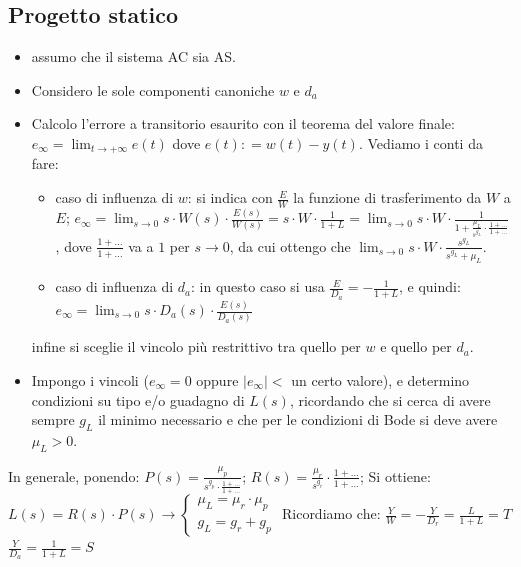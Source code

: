     \subsection{Progetto statico}
    \begin{itemize}
        \item assumo che il sistema AC sia AS.
        \item Considero le sole componenti canoniche $w$ e $d_a$
        \item Calcolo l'errore a transitorio esaurito con il teorema del valore finale:\newline
        $e_\infty = \lim_{t\rightarrow +\infty} e(t)$ dove $e(t) : = w(t) - y(t)$.\newline
        Vediamo i conti da fare:
        \begin{itemize}
            \item caso di influenza di $w$: si indica con $\frac{E}{W}$ la funzione di trasferimento da $W$ a $E$; $e_\infty = \lim_{s\rightarrow 0} s \cdot W(s) \cdot \frac{E(s)}{W(s)} = s \cdot W \cdot  \frac{1}{1+L} = \lim_{s\rightarrow 0} s \cdot W \cdot \frac{1}{1+ \frac{\mu_L}{s^{g_L}} \cdot \frac{1 + \dots}{1 + \dots}}$, dove $\frac{1 + \dots}{1 + \dots}$ va a $1$ per $s \rightarrow 0$, da cui ottengo che $\lim_{s\rightarrow 0} s \cdot W \cdot \frac{s^{g_L}}{s^{g_L} + \mu_L}$.
            \item caso di influenza di $d_a$: in questo caso si usa $\frac{E}{D_a} = - \frac{1}{1+L}$, e quindi: $e_\infty = \lim_{s\rightarrow 0} s \cdot D_a(s) \cdot \frac{E(s)}{D_a(s)}$
        \end{itemize}
        infine si sceglie il vincolo più restrittivo tra quello per $w$ e quello per $d_a$.
        \item Impongo i vincoli ($e_\infty = 0$ oppure $|e_\infty| < $ un certo valore), e determino condizioni su tipo e/o guadagno di $L(s)$, ricordando che si cerca di avere sempre $g_L$ il minimo necessario e che per le condizioni di Bode si deve avere $\mu_L > 0$.
    \end{itemize}
    In generale, ponendo: \newline
    $P(s) = \frac{\mu_p}{s^{g_p} \cdot  \frac{1+ \dots}{1+ \dots}}$;\newline
    $R(s) = \frac{\mu_r}{s^{g_r}} \cdot  \frac{1+ \dots}{1+ \dots}$;\newline
    Si ottiene: \newline
    $L(s) = R(s) \cdot P(s) \rightarrow \begin{cases}
        \mu_L = \mu_r \cdot \mu_p\\
        g_L = g_r + g_p
    \end{cases}$\newline
    Ricordiamo che:\newline
    $\frac{Y}{W} = - \frac{Y}{D_r} = \frac{L}{1+L} = T$\newline
    $\frac{Y}{D_a} = \frac{1}{1+L} = S$
